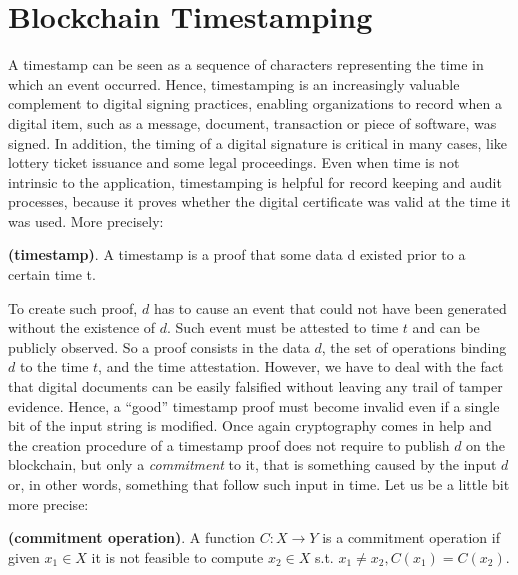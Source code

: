 \bigskip
\section{Blockchain Timestamping}
A timestamp can be seen as a sequence of characters representing the time in which an event occurred. Hence, timestamping is an increasingly valuable complement to digital signing practices, enabling organizations to record when a digital item, such as a message, document, transaction or piece of software, was signed. In addition, the timing of a digital signature is critical in many cases, like lottery ticket issuance and some legal proceedings. Even when time is not intrinsic to the application, timestamping is helpful for record keeping and audit processes, because it proves whether the digital certificate was valid at the time it was used. More precisely:

\begin{mydef}{\bf (timestamp)}.
    A timestamp is a proof that some data d existed prior to a certain time t.
\end{mydef}

\bigskip
\noindent
To create such proof, $d$ has to cause an event that could not have been
generated without the existence of $d$. Such event must be attested to time $t$ and
can be publicly observed. So a proof consists in the data $d$, the set of operations binding $d$ to the time $t$, and the time attestation. However, we have to deal with the fact that digital documents can be easily falsified without leaving any trail of tamper evidence. Hence, a \enquote{good} timestamp proof must become invalid even if a single bit of the input string is modified. Once again cryptography comes in help and the creation procedure of a timestamp proof does not require to publish $d$ on the blockchain, but only a \textit{commitment} to it, that is something caused by the input $d$ or, in other words, something that follow such input in time. Let us be a little bit more precise:
\begin{mydef}{\bf (commitment operation)}.
    A function $C: X \rightarrow Y$ is a commitment operation if given $x_{1} \in X$ it is not feasible to compute $x_{2} \in X$ s.t. $x_{1} \neq x_{2}, C(x_{1}) = C(x_{2})$.
\end{mydef}

